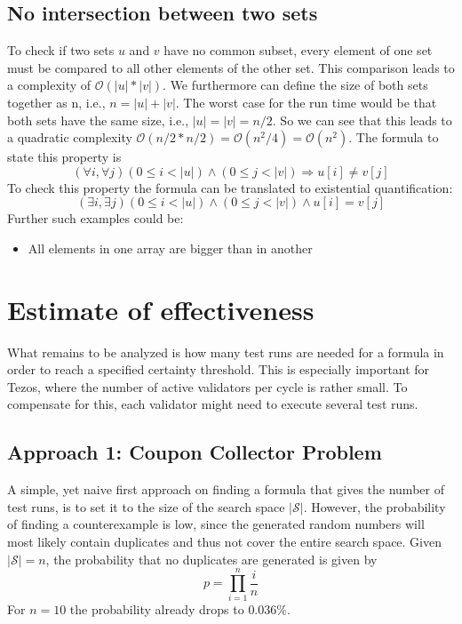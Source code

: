 \documentclass{article}
\begin{document}
\subsection{No intersection between two sets}\label{subsec:nointersection}
To check if two sets $u$ and $v$ have no common subset, every element of one set must be compared to all other elements of the other set. This comparison leads to a complexity of $\mathcal{O}(|u|*|v|)$. We furthermore can define the size of both sets together as n, i.e., $n = |u|+|v|$. The worst case for the run time would be that both sets have the same size, i.e., $|u| = |v| = n/2$. So we can see that this leads to a quadratic complexity $\mathcal{O}(n/2 * n/2) = \mathcal{O}(n^2/4) = \mathcal{O}(n^2)$. The formula to state this property is
\begin{equation}\label{eq:intersection-unversial}
  (\forall i, \forall j) (0 \le i < |u|) \land (0 \le j < |v|) \Rightarrow u[i] \neq v[j]
\end{equation}
To check this property the formula can be translated to existential quantification:
\begin{equation}\label{eq:intersection-existential}
  (\exists i, \exists j) (0 \le i < |u|) \land (0 \le j < |v|) \land u[i] = v[j]
\end{equation}
Further such examples could be:
\begin{itemize}
    \item All elements in one array are bigger than in another
\end{itemize}

\section{Estimate of effectiveness}
What remains to be analyzed is how many test runs are needed for a formula in order to reach a specified certainty threshold. This is especially important for Tezos, where the number of active validators per cycle is rather small. To compensate for this, each validator might need to execute several test runs.

\subsection{Approach 1: Coupon Collector Problem}
A simple, yet naive first approach on finding a formula that gives the number of test runs, is to set it to the size of the search space $|\mathcal{S}|$.
However, the probability of finding a counterexample is low, since the generated random numbers will most likely contain duplicates and thus not cover the entire search space. Given $|\mathcal{S}| = n$, the probability that no duplicates are generated is given by
\begin{equation*}
    p = \prod_{i=1}^{n} \frac{i}{n}
\end{equation*}
For $n = 10$ the probability already drops to $0.036\%$.
\end{document}

